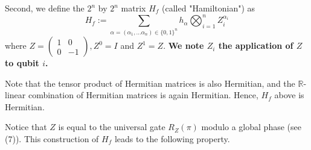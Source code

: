 Second, we define the $2^n$ by $2^n$ matrix $H_{f}$ (called "Hamiltonian") as
$$
H_{f}:=\sum_{\alpha=\left(\alpha_{1}, \ldots \alpha_{n}\right) \in\{0,1\}^{n}} h_{\alpha} \bigotimes_{i=1}^{n} Z_{i}^{\alpha_{i}}
$$
where $Z=\left(\begin{array}{cc}1 & 0 \\ 0 & -1\end{array}\right), Z^{0}=I$ and $Z^{1}=Z$. \textbf{We note $Z_{i}$ the application of $Z$ to qubit $i$. } %

Note that the tensor product of Hermitian matrices is also Hermitian, and the $\mathbb{R}$-linear combination of Hermitian matrices is again Hermitian. Hence, $H_{f}$ above is Hermitian.

Notice that $Z$ is equal to the universal gate $R_{Z}(\pi)$ modulo a global phase (see (7)). This construction of $H_{f}$ leads to the following property.

